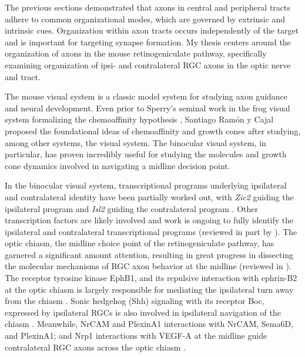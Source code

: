 The previous sections demonstrated that axons in central and peripheral tracts adhere to common organizational modes, which are governed by extrinsic and intrinsic cues.
Organization within axon tracts occurs independently of the target and is important for targeting synapse formation.
My thesis centers around the organization of axons in the mouse retinogeniculate pathway, specifically examining organization of ipsi- and contralateral RGC axons in the optic nerve and tract.

The mouse visual system is a classic model system for studying axon guidance and neural development.
Even prior to Sperry's seminal work in the frog visual system formalizing the chemoaffinity hypothesis \cite{sperry1963chemoaffinity}, Santiago Ram\'on y Cajal proposed the foundational ideas of chemoaffinity and growth cones after studying, among other systems, the visual system.
The binocular visual system, in particular, has proven incredibly useful for studying the molecules and growth cone dynamics involved in navigating a midline decision point.

In the binocular visual system, transcriptional programs underlying ipsilateral and contralateral identity have been partially worked out, with \emph{Zic2} guiding the ipsilateral program and \emph{Isl2} guiding the contralateral program \cite{herrera2003zic2,pak2004magnitude,garcia2008zic2}.
Other transcription factors are likely involved and work is ongoing to fully identify the ipsilateral and contralateral transcriptional programs (reviewed in part by ).
The optic chiasm, the midline choice point of the retinogeniculate pathway, has garnered a significant amount attention, resulting in great progress in dissecting the molecular mechanisms of RGC axon behavior at the midline (reviewed in ).
The receptor tyrosine kinase EphB1, and its repulsive interaction with ephrin-B2 at the optic chiasm is largely responsible for mediating the ipsilateral turn away from the chiasm \cite{nakagawa2000ephrin,williams2003ephrin,petros2009specificity}.
Sonic hedgehog (Shh) signaling with its receptor Boc, expressed by ipsilateral RGCs is also involved in ipsilateral navigation of the chiasm \cite{fabre2010segregation}.
Meanwhile, NrCAM and PlexinA1 interactions with NrCAM, Sema6D, and PlexinA1; and Nrp1 interactions with VEGF-A at the midline guide contralateral RGC axons across the optic chiasm \cite{williams2006role,erskine2011vegf,kuwajima2012optic}.

